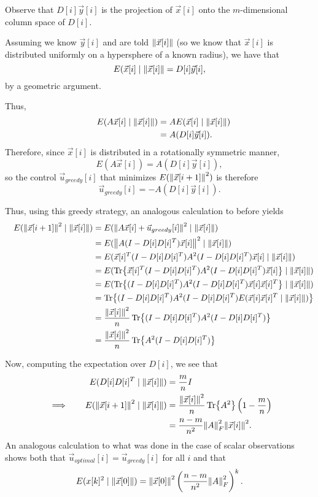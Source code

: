 \documentclass[letterpaper]{article}
\theoremstyle{remark}
\newcommand{\eqn}[1]{\begin{alignat*}{2}#1\end{alignat*}}
\newcommand*{\thus}{&\implies\quad&}
\begin{document}
Observe that $D[i]\vec{y}[i]$ is the projection of $\vec{x}[i]$ onto the $m$-dimensional column space of $D[i]$.

Assuming we know $\vec{y}[i]$ and are told $\norm{\vec{x}[i]}$ (so we know that $\vec{x}[i]$ is distributed uniformly on a hypersphere of a known radius), we have that
\[
    E(\vec{x}[i] \mid \norm{\vec{x}[i]} = D[i]\vec{y}[i],
\]
by a geometric argument.

Thus,
\eqn{
    && E(A\vec{x}[i] \mid \norm{\vec{x}[i]}) &= AE(\vec{x}[i] \mid \norm{\vec{x}[i]}) \\
    &&&= A(D[i] \vec{y}[i]).
}
Therefore, since $\vec{x}[i]$ is distributed in a rotationally symmetric manner,
\[
    E(A\vec{x}[i]) = A(D[i] \vec{y}[i]),
\]
so the control $\vec{u}_{greedy}[i]$ that minimizes $E(\norm{\vec{x}[i + 1]}^2)$ is therefore
\[
    \vec{u}_{greedy}[i] = -A(D[i] \vec{y}[i]).
\]

Thus, using this greedy strategy, an analogous calculation to before yields
\eqn{
    && E(\norm{\vec{x}[i + 1]}^2 \mid \norm{\vec{x}[i]}) &= E(\norm{A\vec{x}[i] + \vec{u}_{greedy}[i]}^2 \mid \norm{\vec{x}[i]}) \\
    &&&= E(\norm{A(I - D[i]D[i]^T)\vec{x}[i]}^2 \mid \norm{\vec{x}[i]}) \\
    &&&= E(\vec{x}[i]^T(I - D[i]D[i]^T)A^2(I - D[i]D[i]^T) \vec{x}[i] \mid \norm{\vec{x}[i]}) \\
    &&&= E(\Tr{\vec{x}[i]^T(I - D[i]D[i]^T)A^2(I - D[i]D[i]^T) \vec{x}[i]} \mid \norm{\vec{x}[i]}) \\
    &&&= E(\Tr{(I - D[i]D[i]^T)A^2(I - D[i]D[i]^T) \vec{x}[i]\vec{x}[i]^T} \mid \norm{\vec{x}[i]}) \\
    &&&= \Tr{(I - D[i]D[i]^T)A^2(I - D[i]D[i]^T) E(\vec{x}[i]\vec{x}[i]^T \mid \norm{\vec{x}[i]})} \\
    &&&= \frac{\norm{\vec{x}[i]}^2}{n}\Tr{(I - D[i]D[i]^T)A^2(I - D[i]D[i]^T)} \\
    &&&= \frac{\norm{\vec{x}[i]}^2}{n}\Tr{A^2(I - D[i]D[i]^T)} \\
}

Now, computing the expectation over $D[i]$, we see that
\eqn{
    && E(D[i]D[i]^T \mid \norm{\vec{x}[i]}) &= \frac{m}{n}I \\
    \thus E(\norm{\vec{x}[i + 1]}^2 \mid \norm{\vec{x}[i]}) &= \frac{\norm{\vec{x}[i]}^2}{n} \Tr{A^2} \left(1 - \frac{m}{n}\right) \\
    &&&= \frac{n - m}{n^2} \norm{A}_F^2 \norm{\vec{x}[i]}^2.
}
An analogous calculation to what was done in the case of scalar observations shows both that $\vec{u}_{optimal}[i] = \vec{u}_{greedy}[i]$ for all $i$ and that
\[
    E(x[k]^2 \mid \norm{\vec{x}[0]}) = \norm{\vec{x}[0]}^2 \left(\frac{n - m}{n^2} \norm{A}_F^2\right)^{k}.
\]
\end{document}
